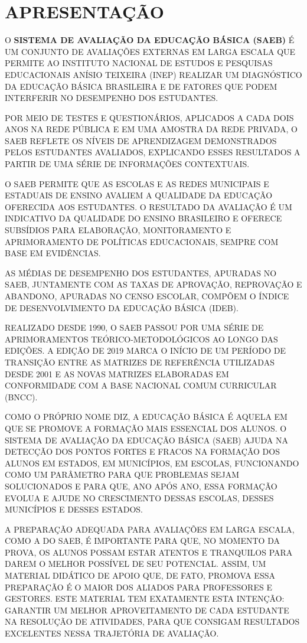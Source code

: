 \chapter{APRESENTAÇÃO}

O \textbf{SISTEMA DE AVALIAÇÃO DA EDUCAÇÃO BÁSICA (SAEB)} É UM CONJUNTO
DE AVALIAÇÕES EXTERNAS EM LARGA ESCALA QUE PERMITE AO INSTITUTO NACIONAL
DE ESTUDOS E PESQUISAS EDUCACIONAIS ANÍSIO TEIXEIRA (INEP) REALIZAR UM
DIAGNÓSTICO DA EDUCAÇÃO BÁSICA BRASILEIRA E DE FATORES QUE PODEM
INTERFERIR NO DESEMPENHO DOS ESTUDANTES.

POR MEIO DE TESTES E QUESTIONÁRIOS, APLICADOS A CADA DOIS ANOS NA REDE
PÚBLICA E EM UMA AMOSTRA DA REDE PRIVADA, O SAEB REFLETE OS NÍVEIS DE
APRENDIZAGEM DEMONSTRADOS PELOS ESTUDANTES AVALIADOS, EXPLICANDO ESSES
RESULTADOS A PARTIR DE UMA SÉRIE DE INFORMAÇÕES CONTEXTUAIS.

O SAEB PERMITE QUE AS ESCOLAS E AS REDES MUNICIPAIS E ESTADUAIS DE
ENSINO AVALIEM A QUALIDADE DA EDUCAÇÃO OFERECIDA AOS ESTUDANTES. O
RESULTADO DA AVALIAÇÃO É UM INDICATIVO DA QUALIDADE DO ENSINO BRASILEIRO
E OFERECE SUBSÍDIOS PARA ELABORAÇÃO, MONITORAMENTO E APRIMORAMENTO DE
POLÍTICAS EDUCACIONAIS, SEMPRE COM BASE EM EVIDÊNCIAS.

AS MÉDIAS DE DESEMPENHO DOS ESTUDANTES, APURADAS NO SAEB, JUNTAMENTE COM
AS TAXAS DE APROVAÇÃO, REPROVAÇÃO E ABANDONO, APURADAS NO CENSO ESCOLAR,
COMPÕEM O ÍNDICE DE DESENVOLVIMENTO DA EDUCAÇÃO BÁSICA (IDEB).

REALIZADO DESDE 1990, O SAEB PASSOU POR UMA SÉRIE DE APRIMORAMENTOS
TEÓRICO-METODOLÓGICOS AO LONGO DAS EDIÇÕES. A EDIÇÃO DE 2019 MARCA O
INÍCIO DE UM PERÍODO DE TRANSIÇÃO ENTRE AS MATRIZES DE REFERÊNCIA
UTILIZADAS DESDE 2001 E AS NOVAS MATRIZES ELABORADAS EM CONFORMIDADE COM
A BASE NACIONAL COMUM CURRICULAR (BNCC).

\pagebreak
{}

COMO O PRÓPRIO NOME DIZ, A EDUCAÇÃO BÁSICA É AQUELA EM QUE SE PROMOVE A
FORMAÇÃO MAIS ESSENCIAL DOS ALUNOS. O SISTEMA DE AVALIAÇÃO DA EDUCAÇÃO
BÁSICA (SAEB) AJUDA NA DETECÇÃO DOS PONTOS FORTES E FRACOS NA FORMAÇÃO
DOS ALUNOS EM ESTADOS, EM MUNICÍPIOS, EM ESCOLAS, FUNCIONANDO COMO UM
PARÂMETRO PARA QUE PROBLEMAS SEJAM SOLUCIONADOS E PARA QUE, ANO APÓS
ANO, ESSA FORMAÇÃO EVOLUA E AJUDE NO CRESCIMENTO DESSAS ESCOLAS, DESSES
MUNICÍPIOS E DESSES ESTADOS.

A PREPARAÇÃO ADEQUADA PARA AVALIAÇÕES EM LARGA ESCALA, COMO A DO SAEB, É
IMPORTANTE PARA QUE, NO MOMENTO DA PROVA, OS ALUNOS POSSAM ESTAR ATENTOS
E TRANQUILOS PARA DAREM O MELHOR POSSÍVEL DE SEU POTENCIAL. ASSIM, UM
MATERIAL DIDÁTICO DE APOIO QUE, DE FATO, PROMOVA ESSA PREPARAÇÃO É O
MAIOR DOS ALIADOS PARA PROFESSORES E GESTORES. ESTE MATERIAL TEM
EXATAMENTE ESTA INTENÇÃO: GARANTIR UM MELHOR APROVEITAMENTO DE CADA
ESTUDANTE NA RESOLUÇÃO DE ATIVIDADES, PARA QUE CONSIGAM RESULTADOS
EXCELENTES NESSA TRAJETÓRIA DE AVALIAÇÃO.

